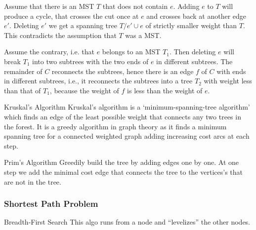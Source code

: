 \begin{prooof}
    Assume that there is an MST $T$ that does not contain $e$. Adding $e$ to
    $T$ will produce a cycle, that crosses the cut once at $e$ and crosses
    back at another edge $e'$. Deleting $e'$ we get a spanning tree
    $T/{e'}\cup{e}$ of strictly smaller weight than $T$. This contradicts the
    assumption that $T$ was a MST. 
\end{prooof}


\begin{prooof}
    Assume the contrary, i.e. that $e$ belongs to an MST $T_1$. Then deleting
    $e$ will break $T_1$ into two subtrees with the two ends of $e$ in
    different subtrees. The remainder of $C$ reconnects the subtrees, hence
    there is an edge $f$ of $C$ with ends in different subtrees, i.e., it
    reconnects the subtrees into a tree $T_2$ with weight less than that of
    $T_1$, because the weight of $f$ is less than the weight of $e$.
\end{prooof}



{Kruskal's Algorithm}{
    Kruskal's algorithm is a `minimum-spanning-tree algorithm' which
    finds an edge of the least possible weight that connects any two trees in the
    forest. It is a greedy algorithm in graph theory as it finds a minimum
    spanning tree for a connected weighted graph adding increasing cost arcs at
    each step.
}



{Prim's Algorithm}{
    Greedily build the tree by adding edges one by one. At one step we
    add the minimal cost edge that connects the tree to the vertices's that are
    not in the tree.
}

\subsubsection{Shortest Path Problem}



{Breadth-First Search}{
    This algo runs from a node and ``levelizes'' the other nodes.
}


